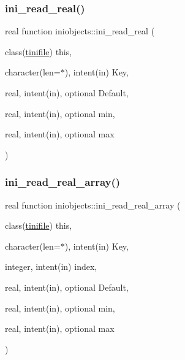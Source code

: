 \subsubsection{\texorpdfstring{ini\+\_\+read\+\_\+real()}{ini\_read\_real()}}
{\footnotesize\ttfamily real function iniobjects\+::ini\+\_\+read\+\_\+real (\begin{DoxyParamCaption}\item[{class(\mbox{\hyperlink{structiniobjects_1_1tinifile}{tinifile}})}]{this,  }\item[{character(len=$\ast$), intent(in)}]{Key,  }\item[{real, intent(in), optional}]{Default,  }\item[{real, intent(in), optional}]{min,  }\item[{real, intent(in), optional}]{max }\end{DoxyParamCaption})\hspace{0.3cm}{\ttfamily [private]}}

\mbox{\label{namespaceiniobjects_ac6b89cdbdb8074900386085ded996bc7}} 
\subsubsection{\texorpdfstring{ini\+\_\+read\+\_\+real\+\_\+array()}{ini\_read\_real\_array()}}
{\footnotesize\ttfamily real function iniobjects\+::ini\+\_\+read\+\_\+real\+\_\+array (\begin{DoxyParamCaption}\item[{class(\mbox{\hyperlink{structiniobjects_1_1tinifile}{tinifile}})}]{this,  }\item[{character(len=$\ast$), intent(in)}]{Key,  }\item[{integer, intent(in)}]{index,  }\item[{real, intent(in), optional}]{Default,  }\item[{real, intent(in), optional}]{min,  }\item[{real, intent(in), optional}]{max }\end{DoxyParamCaption})\hspace{0.3cm}{\ttfamily [private]}}

\mbox{\label{namespaceiniobjects_ab840810b30c65a67b6834782fe064f34}} 
